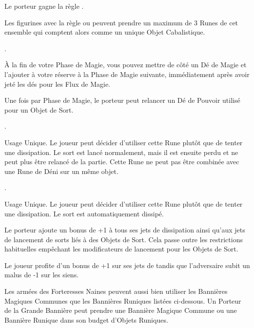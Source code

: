 \begin{multicols}{2}
Le porteur gagne la règle \fireborn{}.

\endpricelist

\subtitle{Runes Cabalistiques}\vspace{5pt}

Les figurines avec la règle \runecraft{} ou \runecraftmastery{} peuvent prendre un maximum de 3 Runes de cet ensemble qui comptent alors comme un unique Objet Cabalistique.

\startpricelistNSP

\oneofakind{}.

À la fin de votre Phase de Magie, vous pouvez mettre de côté un Dé de Magie et l'ajouter à votre réserve à la Phase de Magie suivante, immédiatement après avoir jeté les dés pour les Flux de Magie.

Une fois par Phase de Magie, le porteur peut relancer un Dé de Pouvoir utilisé pour un Objet de Sort.

\columnbreak
\vspace*{1.93cm}

\oneperarmy{}.

Usage Unique. Le joueur peut décider d'utiliser cette Rune plutôt que de tenter une dissipation. Le sort est lancé normalement, mais il est ensuite perdu et ne peut plus être relancé de la partie. Cette Rune ne peut pas être combinée avec une Rune de Déni sur un même objet.

\oneperarmy{}.

Usage Unique. Le joueur peut décider d'utiliser cette Rune plutôt que de tenter une dissipation. Le sort est automatiquement dissipé.

 Le porteur ajoute un bonus de +1 à tous ses jets de dissipation ainsi qu'aux jets de lancement de sorts liés à des Objets de Sort. Cela passe outre les restrictions habituelles empêchant les modificateurs de lancement pour les Objets de Sort.

 Le joueur profite d'un bonus de +1 sur ses jets de \channel{} tandis que l'adversaire subit un malus de -1 sur les siens.

\endpricelistNSP

\subtitle{Bannières Runiques}\vspace{5pt}

Les armées des Forteresses Naines peuvent aussi bien utiliser les Bannières Magiques Communes que les Bannières Runiques listées ci-dessous. Un Porteur de la Grande Bannière peut prendre une Bannière Magique Commune ou une Bannière Runique dans son budget d'Objets Runiques.


\end{multicols}
